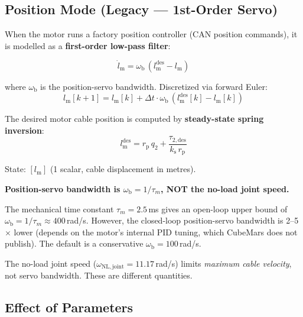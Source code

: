 \documentclass[11pt,a4paper]{article}
\newcommand{\rp}{r_{\mathrm{p}}}
\newcommand{\lm}{l_{\mathrm{m}}}
\newcommand{\lmd}{\dot{l}_{\mathrm{m}}}
\newcommand{\ks}{k_{\mathrm{s}}}
\newcommand{\wb}{\omega_{\mathrm{b}}}
\begin{document}
\subsection{Position Mode (Legacy --- 1st-Order Servo)}
\label{sec:position_mode}

When the motor runs a factory position controller (CAN position commands), it is modelled as a \textbf{first-order low-pass filter}:

\begin{equation}
\boxed{\lmd = \wb \, (\lm^{\mathrm{des}} - \lm)}
\label{eq:motor_servo}
\end{equation}

where $\wb$ is the position-servo bandwidth.  Discretized via forward Euler:
\begin{equation}
    \lm[k+1] = \lm[k] + \Delta t \cdot \wb \, (\lm^{\mathrm{des}}[k] - \lm[k])
\label{eq:motor_discrete}
\end{equation}

The desired motor cable position is computed by \textbf{steady-state spring inversion}:
\begin{equation}
\boxed{\lm^{\mathrm{des}} = \rp \, q_2 + \frac{\tau_{2,\mathrm{des}}}{\ks \, \rp}}
\label{eq:lm_des}
\end{equation}

State: $[\lm]$ (1 scalar, cable displacement in metres).

\begin{warnbox}
\textbf{Position-servo bandwidth is $\wb = 1/\tau_m$, NOT the no-load joint speed.}

The mechanical time constant $\tau_m = 2.5$\,ms gives an open-loop upper bound of $\wb = 1/\tau_m \approx 400$\,rad/s.  However, the closed-loop position-servo bandwidth is 2--5$\times$ lower (depends on the motor's internal PID tuning, which CubeMars does not publish).  The default is a conservative $\wb = 100$\,rad/s.

The no-load joint speed ($\omega_{\mathrm{NL,joint}} = 11.17$\,rad/s) limits \emph{maximum cable velocity}, not servo bandwidth.  These are different quantities.
\end{warnbox}


\subsection{Effect of Parameters}
\end{document}
